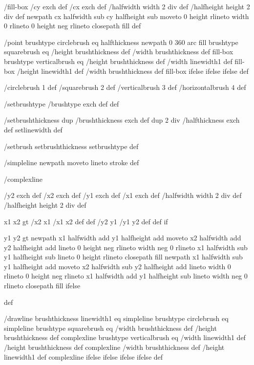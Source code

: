 /fill-box
  { /cy exch def /cx exch def
    /halfwidth width 2 div def
    /halfheight height 2 div def
    newpath
     cx halfwidth sub cy halfheight sub moveto
     0 height rlineto
     width 0 rlineto
     0 height neg rlineto
     closepath
     fill } def

/point
  { brushtype circlebrush eq
     { halfthickness newpath 0 360 arc fill }
     { brushtype squarebrush eq
        { /height brushthickness def
	  /width brushthickness def
	  fill-box }
        { brushtype verticalbrush eq
           { /height brushthickness def
	     /width linewidth1 def
	     fill-box }
           { /height linewidth1 def
	     /width brushthickness def
	     fill-box }
	   ifelse }
        ifelse }
     ifelse } def

/circlebrush     1 def
/squarebrush     2 def
/verticalbrush   3 def
/horizontalbrush 4 def

/setbrushtype { /brushtype exch def } def

/setbrushthickness
  { dup /brushthickness exch def
    dup 2 div /halfthickness exch def
    setlinewidth } def

/setbrush { setbrushthickness setbrushtype } def

/simpleline { newpath moveto lineto stroke } def

/complexline
  { /y2 exch def /x2 exch def
    /y1 exch def /x1 exch def
    /halfwidth width 2 div def
    /halfheight height 2 div def

    x1 x2 gt { /x2 x1 /x1 x2 def def /y2 y1 /y1 y2 def def } if

    y1 y2 gt
     { %
       newpath
        x1 halfwidth add y1 halfheight add moveto
	x2 halfwidth add y2 halfheight add lineto
	0 height neg rlineto
        width neg 0 rlineto
        x1 halfwidth sub y1 halfheight sub lineto
        0 height rlineto
        closepath
	fill }
     { %
       newpath
        x1 halfwidth sub y1 halfheight add moveto
	x2 halfwidth sub y2 halfheight add lineto
	width 0 rlineto
	0 height neg rlineto
	x1 halfwidth add y1 halfheight sub lineto
	width neg 0 rlineto
	closepath
	fill }
     ifelse } def

/drawline
  { brushthickness linewidth1 eq
    { simpleline }
    { brushtype circlebrush eq
       { %
         simpleline }
       { brushtype squarebrush eq
          { %
            /width brushthickness def
	    /height brushthickness def
	    complexline }
          { brushtype verticalbrush eq
             { %
	       /width linewidth1 def
	       /height brushthickness def
	       complexline }
             { %
	       /width brushthickness def
	       /height linewidth1 def
	       complexline }
             ifelse }
          ifelse }
       ifelse }
    ifelse } def

